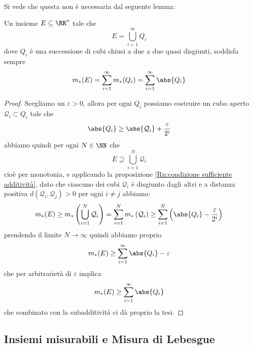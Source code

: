 \documentclass[11pt]{scrartcl}
\begin{document}
	Si vede che questa non è necessaria dal seguente lemma:
	\begin{lemma}\label{Rn:unione quasi disgiunta di cubi}
		Un insieme $E\subseteq\RR^n$ tale che 
		$$E=\bigcup_{i=1}^\infty Q_i$$
		dove $Q_i$ è una successione di cubi chiusi a due a due quasi disgiunti, soddisfa sempre
		$$m_*(E)=\sum_{i=1}^{\infty}m_*(Q_i)=\sum_{i=1}^{\infty}\abs{Q_i}$$
	\end{lemma}
	\begin{proof}
		Scegliamo un $\varepsilon>0$, allora per ogni $Q_i$ possiamo costruire un cubo aperto $\mathcal{Q}_i\subset Q_i$ tale che 
		$$\abs{Q_i}\ge \abs{\mathcal{Q}_i}+\frac{\varepsilon}{2^i}$$
		abbiamo quindi per ogni $N\in\NN$ che
		$$E\supseteq \bigcup_{i=1}^N \mathcal{Q}_i$$
		cioè per monotonia, e applicando la proposizione \ref{Rn:condizione sufficiente additività}, dato che ciascuno dei cubi $\mathcal{Q}_i$ è disgiunto dagli altri e a distanza positiva $d\left(\mathcal{Q}_i,\mathcal{Q}_j\right)>0$ per ogni $i\ne j$ abbiamo: 
		$$m_*(E)\ge m_*\left(\bigcup_{i=1}^N \mathcal{Q}_i\right)=\sum_{i=1}^{N}m_*\left(\mathcal{Q}_i\right)\ge \sum_{i=1}^{N}\left(\abs{Q_i}-\frac{\varepsilon}{2^i}\right)$$
		prendendo il limite $N\to\infty$ quindi abbiamo proprio
		$$m_*(E)\ge \sum_{i=1}^{\infty}\abs{Q_i}-\varepsilon$$
		che per arbitrarietà di $\varepsilon$ implica
		$$m_*(E)\ge \sum_{i=1}^{\infty}\abs{Q_i}$$
		che combinato con la subadditività ci dà proprio la tesi.
	\end{proof}
	
	\subsection{Insiemi misurabili e Misura di Lebesgue}
	
\end{document}
